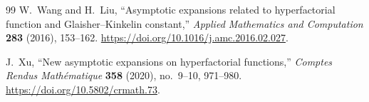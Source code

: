 \documentclass[11pt,oneside]{article}
\theoremstyle{plain}
\theoremstyle{definition}
\theoremstyle{remark}
\begin{document}
\begin{thebibliography}{99}
W.~Wang and H.~Liu,
``Asymptotic expansions related to hyperfactorial function and
Glaisher--Kinkelin constant,''
\emph{Applied Mathematics and Computation} \textbf{283} (2016), 153--162.
\newblock \url{https://doi.org/10.1016/j.amc.2016.02.027}.

J.~Xu,
``New asymptotic expansions on hyperfactorial functions,''
\emph{Comptes Rendus Math\'ematique} \textbf{358} (2020), no.~9--10,
971--980.
\newblock \url{https://doi.org/10.5802/crmath.73}.

\end{thebibliography}
\end{document}
